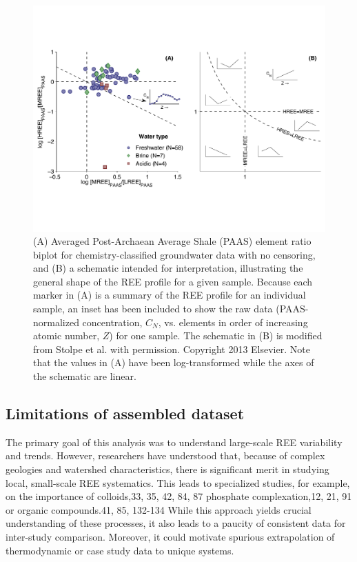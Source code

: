 \begin{figure}[htbp]
\begin{center}
\includegraphics[width=\textwidth]{Ch3_figures/RDV-grouped-biplot.pdf}
\caption{(A) Averaged Post-Archaean Average Shale (PAAS) element ratio biplot for chemistry-classified groundwater data with no censoring, and (B) a schematic intended for interpretation, illustrating the general shape of the REE profile for a given sample.
Because each marker in (A) is a summary of the REE profile for an individual sample, an inset has been included to show the raw data (PAAS-normalized concentration, $C_N$, vs. elements in order of increasing atomic number, $Z$) for one sample.
The schematic in (B) is modified from Stolpe et al. \citep{Stolpe_GCA_2013} with permission.
Copyright 2013 Elsevier.
Note that the values in (A) have been log-transformed while the axes of the schematic are linear.}\label{fig:RDV-biplot}
\end{center}
\end{figure}

\subsection{Limitations of assembled dataset}

The primary goal of this analysis was to understand large-scale REE variability and trends.
However, researchers have understood that, because of complex geologies and watershed characteristics, there is significant merit in studying local, small-scale REE systematics.
This leads to specialized studies, for example, on the importance of colloids,33, 35, 42, 84, 87
phosphate complexation,12, 21, 91
or organic compounds.41, 85, 132-134 
While this approach yields crucial understanding of these processes, it also leads to a paucity of consistent data for inter-study comparison.
Moreover, it could motivate spurious extrapolation of thermodynamic or case study data to unique systems.







